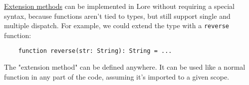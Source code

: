 \href{https://en.wikipedia.org/wiki/Extension_method}{Extension methods} can be implemented in Lore without requiring a special syntax, because functions aren't tied to types, but still support single and multiple dispatch. For example, we could extend the  type with a \texttt{reverse} function:
\begin{lstlisting}
    function reverse(str: String): String = ...
\end{lstlisting}

\noindent The "extension method" can be defined anywhere. It can be used like a normal function in any part of the code, assuming it's imported to a given scope.








